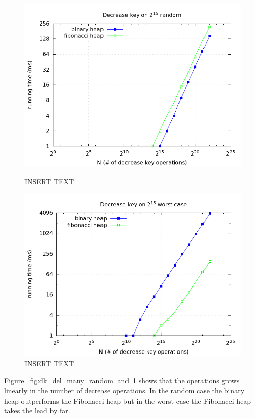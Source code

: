 \documentclass[a4paper,oneside,article,11pt]{memoir}
\begin{document}
\begin{figure}[H]
\centering
\begin{minipage}{0.48\columnwidth}
  \centering
  \includegraphics[width=\linewidth]{../res/dk/dk_random_fixed_size.png}%
  \caption{INSERT TEXT}
  \label{fig:dk_del_many_random}
\end{minipage}%
\hfill
\begin{minipage}{0.48\columnwidth}
  \centering
  \includegraphics[width=\linewidth]{../res/dk/dk_worst_fixed_size.png}%
  \caption{INSERT TEXT}
  \label{fig:dk_del_many_worst}
\end{minipage}
\end{figure}

Figure~\ref{fig:dk_del_many_random} and~\ref{fig:dk_del_many_worst} shows that the operations grows linearly in the number of decrease operations. In the random case the binary heap outperforms the Fibonacci heap but in the worst case the Fibonacci heap takes the lead by far.
\end{document}
